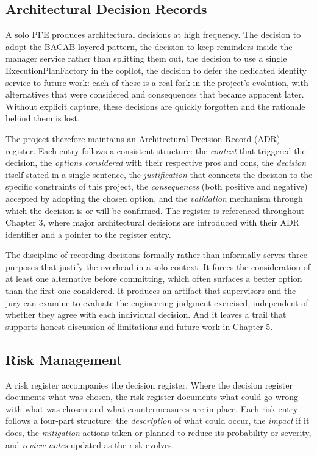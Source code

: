 \subsection*{Architectural Decision Records}
A solo PFE produces architectural decisions at high frequency. The decision to adopt the BACAB layered pattern, the decision to keep reminders inside the manager service rather than splitting them out, the decision to use a single ExecutionPlanFactory in the copilot, the decision to defer the dedicated identity service to future work: each of these is a real fork in the project's evolution, with alternatives that were considered and consequences that became apparent later. Without explicit capture, these decisions are quickly forgotten and the rationale behind them is lost.

The project therefore maintains an Architectural Decision Record (ADR) register. Each entry follows a consistent structure: the \textit{context} that triggered the decision, the \textit{options considered} with their respective pros and cons, the \textit{decision} itself stated in a single sentence, the \textit{justification} that connects the decision to the specific constraints of this project, the \textit{consequences} (both positive and negative) accepted by adopting the chosen option, and the \textit{validation} mechanism through which the decision is or will be confirmed. The register is referenced throughout Chapter 3, where major architectural decisions are introduced with their ADR identifier and a pointer to the register entry.

The discipline of recording decisions formally rather than informally serves three purposes that justify the overhead in a solo context. It forces the consideration of at least one alternative before committing, which often surfaces a better option than the first one considered. It produces an artifact that supervisors and the jury can examine to evaluate the engineering judgment exercised, independent of whether they agree with each individual decision. And it leaves a trail that supports honest discussion of limitations and future work in Chapter 5.

\subsection*{Risk Management}
A risk register accompanies the decision register. Where the decision register documents what was chosen, the risk register documents what could go wrong with what was chosen and what countermeasures are in place. Each risk entry follows a four-part structure: the \textit{description} of what could occur, the \textit{impact} if it does, the \textit{mitigation} actions taken or planned to reduce its probability or severity, and \textit{review notes} updated as the risk evolves.

